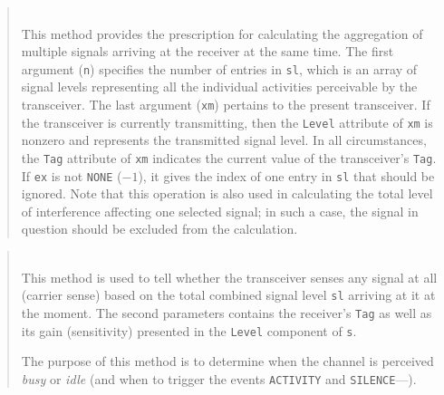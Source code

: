 \begin{quote}
\noindent{} \hspace{0in}\vspace{0.05in}\\
\noindent
This method provides the prescription for calculating the aggregation of
multiple signals arriving at the receiver at the same time.
The first argument ({\tt n})
specifies the number of entries in {\tt sl}, which is
an array of signal levels representing all the individual
activities perceivable by the transceiver.
The last argument ({\tt xm}) pertains to the present transceiver.
If the transceiver is currently transmitting, then the {\tt Level} attribute
of {\tt xm} is nonzero and represents the transmitted signal level.
In all circumstances, the {\tt Tag} attribute of {\tt xm} indicates the current
value of the transceiver's {\tt Tag}.
If {\tt ex} is not {\tt NONE} ($-1$), it gives the index of one entry
in {\tt sl} that should be ignored.
Note that this operation is also used in calculating the total level of interference
affecting one selected signal; in such a case, the signal in question should be
excluded from the calculation.
\end{quote}

\begin{quote}
\noindent{} \hspace{0in}\vspace{0.05in}\\
\noindent
This method is used to tell whether the transceiver senses any signal at
all (carrier sense)
based on the total combined signal level {\tt sl} arriving at it at the moment.
The second parameters contains the receiver's {\tt Tag} as well as its
gain (sensitivity) presented in the {\tt Level} component of {\tt s}.

The purpose of this method is to determine when the channel is perceived
{\em busy\/} or {\em idle\/} (and when to trigger the events {\tt ACTIVITY} and
{\tt SILENCE}---).
\end{quote}

